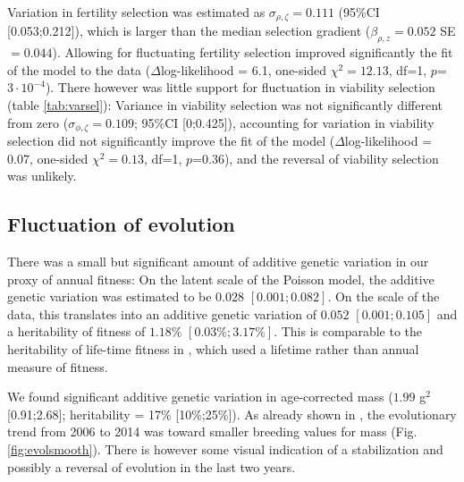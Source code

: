 Variation in fertility selection was estimated as $\sigma_{\rho,\zeta}=0.111$ (95\%CI [0.053;0.212]), which is larger than the median selection gradient ($\beta_{\rho,z}=0.052$ SE$=0.044$). Allowing for fluctuating fertility selection improved significantly the fit of the model to the data ($\Delta$log-likelihood = 6.1, one-sided $\chi^2=12.13$, df=1, $p$=$3\cdot10^{-4}$). There however was little support for fluctuation in viability selection (table \ref{tab:varsel}): Variance in viability selection was not significantly different from zero ($\sigma_{\phi,\zeta}=0.109$; 95\%CI [0;0.425]), accounting for variation in viability selection did not significantly improve the fit of the model ($\Delta$log-likelihood = 0.07, one-sided $\chi^2=0.13$, df=1, $p$=0.36), and the reversal of viability selection was unlikely.

\subsection*{Fluctuation of evolution}
There was a small but significant amount of additive genetic variation in our proxy of annual fitness: On the latent scale of the Poisson model, the additive genetic variation was estimated to be $0.028$ $[0.001;0.082]$. On the scale of the data, this translates into an additive genetic variation of $0.052$ $[0.001;0.105]$ and a heritability of fitness of $1.18\%$ $[0.03\%; 3.17\%]$. This is comparable to the heritability of life-time fitness in \cite{Bonnet2016}, which used a lifetime rather than annual measure of fitness. 

We found significant additive genetic variation in age-corrected mass ($1.99$ g$^2$ [0.91;2.68]; heritability = 17\% [10\%;25\%]). As already shown in \cite{Bonnet2016}, the evolutionary trend from 2006 to 2014 was toward smaller breeding values for mass (Fig. \ref{fig:evolsmooth}). There is however some visual indication of a stabilization and possibly a reversal of evolution in the last two years. 


